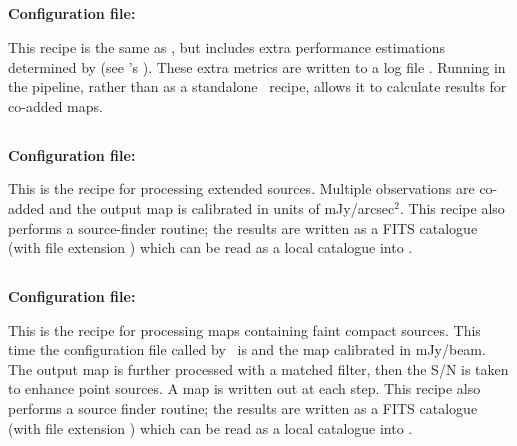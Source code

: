 \subsection{}

\textbf{Configuration file: }

This recipe is the same as , but includes extra
performance estimations determined by 
(see \picard's ). These extra
metrics are written to a log file . Running
 in the pipeline, rather than as a
standalone \picard\ recipe, allows it to calculate results for
co-added maps.


\subsection{}

\textbf{Configuration file: }

This is the recipe for processing extended sources. Multiple
observations are co-added and the output map is calibrated in units of
mJy/arcsec$^2$. This recipe also performs a source-finder routine; the
results are written as a FITS catalogue (with file extension
) which can be read as a local catalogue into \gaia.

\subsection{}

\textbf{Configuration file: }

This is the recipe for processing maps containing faint compact
sources. This time the configuration file called by \makemap\ is
 and the map calibrated in
mJy/beam.  The output map is further processed with a matched filter,
then the S/N is taken to enhance point sources.  A map is written out
at each step.  This recipe also performs a source finder routine; the
results are written as a FITS catalogue (with file extension
) which can be read as a local catalogue into \gaia.

\subsection{}

